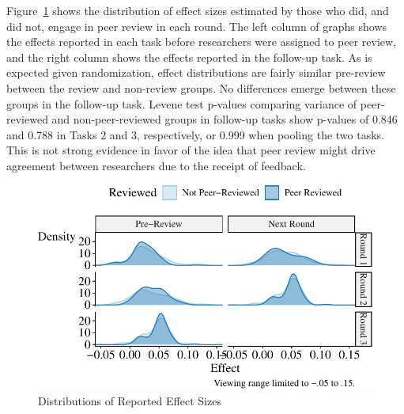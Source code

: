 \documentclass[
  letterpaper,
  DIV=11,
  numbers=noendperiod]{scrartcl}
\begin{document}
Figure~\ref{fig-peer-review-effect-distributions} shows the distribution
of effect sizes estimated by those who did, and did not, engage in peer
review in each round. The left column of graphs shows the effects
reported in each task before researchers were assigned to peer review,
and the right column shows the effects reported in the follow-up task.
As is expected given randomization, effect distributions are fairly
similar pre-review between the review and non-review groups. No
differences emerge between these groups in the follow-up task. Levene
test p-values comparing variance of peer-reviewed and non-peer-reviewed
groups in follow-up tasks show p-values of 0.846 and 0.788 in Tasks 2
and 3, respectively, or 0.999 when pooling the two tasks. This is not
strong evidence in favor of the idea that peer review might drive
agreement between researchers due to the receipt of feedback.

\begin{figure}

{\centering \includegraphics{The-Sources-of-Researcher-Variation-in-Economics_files/figure-pdf/fig-peer-review-effect-distributions-1.pdf}

}

\caption{\label{fig-peer-review-effect-distributions}Distributions of
Reported Effect Sizes}

\end{figure}
\end{document}
